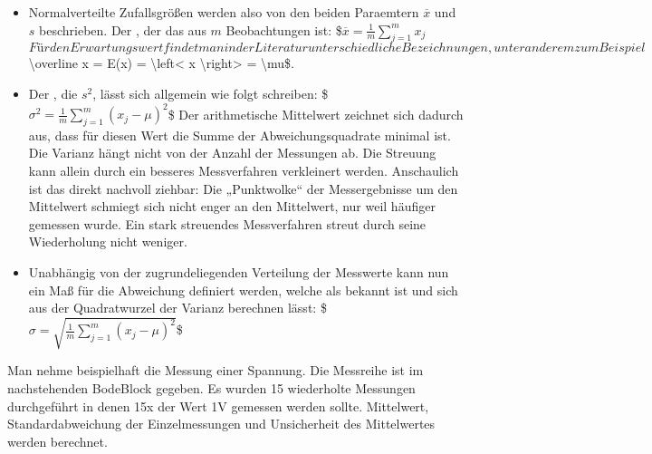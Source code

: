 \documentclass[letterpaper,10pt,english]{jupyterBook}
\begin{document}
\begin{itemize}
\item {} 
\sphinxAtStartPar
Normalverteilte Zufallsgrößen werden also von den beiden Paraemtern \(\overline x\) und \(s\) beschrieben. Der , der das  aus \(m\) Beobachtungen ist:
\$\(\overline x = \frac{1}{m}\sum_{j=1}^m x_j\)\(
Für den Erwartungswert findet man in der Literatur unterschiedliche Bezeichnungen, unter anderem zum Beispiel \)\textbackslash{}overline x = E(x) = \textbackslash{}left< x \textbackslash{}right> = \textbackslash{}mu\$.

\item {} 
\sphinxAtStartPar
Der , die  \(s^2\),
lässt sich allgemein wie folgt schreiben:
\$\(\sigma^2  =  \frac{1}{m} \sum_{j=1}^m \left( x_j - \mu \right)^2\)\$
Der arithmetische Mittelwert zeichnet sich dadurch aus, dass für diesen Wert die Summe der Abweichungsquadrate minimal ist. Die Varianz hängt nicht von der Anzahl der Messungen ab. Die Streuung kann allein durch ein besseres Messverfahren verkleinert werden. Anschaulich ist das direkt nachvoll\sphinxhyphen{} ziehbar: Die „Punktwolke“ der Messergebnisse um den Mittelwert schmiegt sich nicht enger an den Mittelwert, nur weil häufiger gemessen wurde. Ein stark streuendes Messverfahren streut durch seine Wiederholung nicht weniger.

\item {} 
\sphinxAtStartPar
Unabhängig von der zugrundeliegenden Verteilung der Messwerte kann nun ein Maß für die Abweichung definiert werden, welche als  bekannt ist und sich aus der Quadratwurzel der Varianz berechnen lässt:
\$\(\sigma = \sqrt{\frac{1}{m} \sum_{j=1}^m (x_j - \mu)^2}\)\$

\end{itemize}

\sphinxAtStartPar
Man nehme beispielhaft die Messung einer Spannung. Die Messreihe ist im nachstehenden Bode\sphinxhyphen{}Block gegeben. Es wurden 15 wiederholte Messungen durchgeführt in denen 15x der Wert 1V gemessen werden sollte. Mittelwert, Standardabweichung der Einzelmessungen und Unsicherheit des Mittelwertes werden berechnet.
\end{document}
